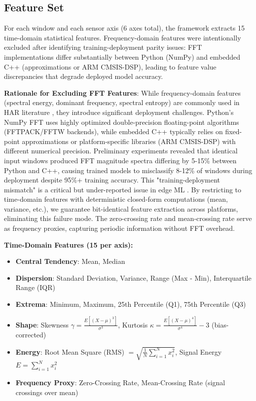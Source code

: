 \subsection{Feature Set}
For each window and each sensor axis (6 axes total), the framework extracts 15 time-domain statistical features. Frequency-domain features were intentionally excluded after identifying training-deployment parity issues: FFT implementations differ substantially between Python (NumPy) and embedded C++ (approximations or ARM CMSIS-DSP), leading to feature value discrepancies that degrade deployed model accuracy.

\textbf{Rationale for Excluding FFT Features}: While frequency-domain features (spectral energy, dominant frequency, spectral entropy) are commonly used in HAR literature \cite{banos2014wisdm}, they introduce significant deployment challenges. Python's NumPy FFT uses highly optimized double-precision floating-point algorithms (FFTPACK/FFTW backends), while embedded C++ typically relies on fixed-point approximations or platform-specific libraries (ARM CMSIS-DSP) with different numerical precision. Preliminary experiments revealed that identical input windows produced FFT magnitude spectra differing by 5-15\% between Python and C++, causing trained models to misclassify 8-12\% of windows during deployment despite 95\%+ training accuracy. This "training-deployment mismatch" is a critical but under-reported issue in edge ML \cite{banbury2021mlperf}. By restricting to time-domain features with deterministic closed-form computations (mean, variance, etc.), we guarantee bit-identical feature extraction across platforms, eliminating this failure mode. The zero-crossing rate and mean-crossing rate serve as frequency proxies, capturing periodic information without FFT overhead.

\textbf{Time-Domain Features (15 per axis):}
\begin{itemize}
    \item \textbf{Central Tendency}: Mean, Median
    \item \textbf{Dispersion}: Standard Deviation, Variance, Range (Max - Min), Interquartile Range (IQR)
    \item \textbf{Extrema}: Minimum, Maximum, 25th Percentile (Q1), 75th Percentile (Q3)
    \item \textbf{Shape}: Skewness $\gamma = \frac{E[(X-\mu)^3]}{\sigma^3}$, Kurtosis $\kappa = \frac{E[(X-\mu)^4]}{\sigma^4} - 3$ (bias-corrected)
    \item \textbf{Energy}: Root Mean Square (RMS) $= \sqrt{\frac{1}{N}\sum_{i=1}^{N} x_i^2}$, Signal Energy $E = \sum_{i=1}^{N} x_i^2$
    \item \textbf{Frequency Proxy}: Zero-Crossing Rate, Mean-Crossing Rate (signal crossings over mean)
\end{itemize}

